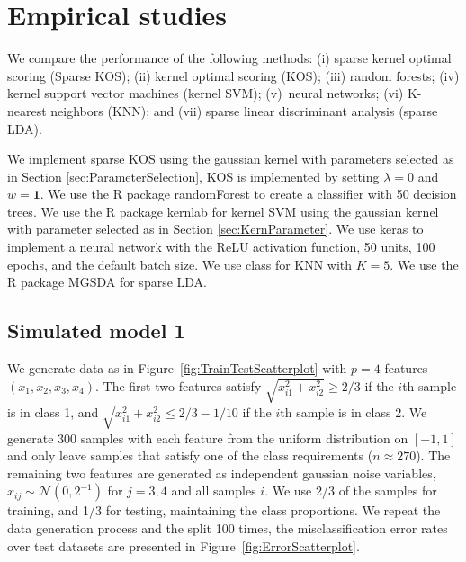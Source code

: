\documentclass[twoside, onecolumn]{article}
\def\one{\mathbf{1}}
\def\Ncal{\mathcal{N}}
\begin{document}


\section{Empirical studies}\label{sec:EmpiricalStudies}

We compare the performance of the following methods: (i) sparse kernel optimal scoring (Sparse KOS); (ii) kernel optimal scoring (KOS); (iii) random forests; (iv) kernel support vector machines (kernel SVM); (v)~neural networks; (vi) K-nearest neighbors (KNN); and (vii) sparse linear discriminant analysis (sparse LDA).

We implement sparse KOS using the gaussian kernel with parameters selected as in Section \ref{sec:ParameterSelection}, KOS is implemented by setting $\lambda = 0$ and $w=\one$. We use the R package \textsf{randomForest} \cite{randomForest} to create a classifier with 50 decision trees. We use the R package \textsf{kernlab} \cite{karatzoglou2004kernlab} for kernel SVM using the gaussian kernel with parameter selected as in Section \ref{sec:KernParameter}. We use \textsf{keras} \cite{chollet2017kerasR} to implement a neural network with the ReLU activation function, 50 units, 100 epochs, and the default batch size.
We use \textsf{class} \cite{KNN} for KNN with $K=5$. We use the R package \textsf{MGSDA} \cite{Gaynanova:2016wk} for sparse LDA. 

\subsection{Simulated model 1}\label{sec:SimulatedData}
We generate data as in Figure~\ref{fig:TrainTestScatterplot} with $p=4$ features $(x_1, x_2, x_3, x_4)$. The first two features satisfy $\sqrt{x_{i1}^2 + x_{i2}^2}\ge 2/3$ if the $i$th sample is in class 1, and $\sqrt{x_{i1}^2 + x_{i2}^2}\le 2/3 - 1/10$ if the $i$th sample is in class 2. We generate $300$ samples with each feature from the uniform distribution on $[-1,1]$ and only leave samples that satisfy one of the class requirements ($n\approx 270$). The remaining two features are generated as independent gaussian noise variables, $x_{ij}\sim \Ncal (0, 2^{-1})$ for $j=3,4$ and all samples $i$. We use 2/3 of the samples for training, and 1/3 for testing, maintaining the class proportions. We repeat the data generation process and the split 100 times, the misclassification error rates over test datasets are presented in Figure~\ref{fig:ErrorScatterplot}.
\end{document}
